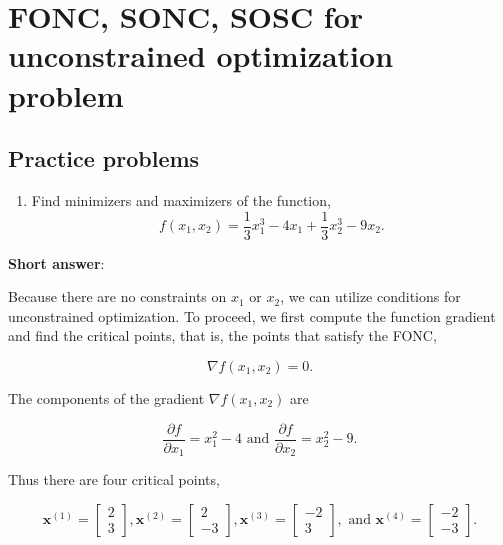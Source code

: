 \section{FONC, SONC, SOSC for unconstrained optimization problem}

\subsection{Practice problems}
\begin{enumerate}
	\item Find minimizers and maximizers of the function,	
	\[
		f\left(x_{1}, x_{2}\right)=\frac{1}{3} x_{1}^{3}-4 x_{1}+\frac{1}{3} x_{2}^{3}-9 x_{2} .
	\]

\end{enumerate}


\textbf{Short answer}:

Because there are no constraints on \(x_{1}\) or \(x_{2}\), we can utilize conditions for unconstrained optimization. To proceed, we first compute the function gradient and find the critical points, that is, the points that satisfy the FONC,

\[
	\nabla f\left(x_{1}, x_{2}\right)=0 .
\]

The components of the gradient \(\nabla f\left(x_{1}, x_{2}\right)\) are

\[
	\frac{\partial f}{\partial x_{1}}=x_{1}^{2}-4 \text { and } \frac{\partial f}{\partial x_{2}}=x_{2}^{2}-9 .
\]

Thus there are four critical points,

\[
	\boldsymbol{x}^{(1)}=\left[\begin{array}{l}
		2 \\
		3
	\end{array}\right], \boldsymbol{x}^{(2)}=\left[\begin{array}{c}
		2 \\
		-3
	\end{array}\right], \boldsymbol{x}^{(3)}=\left[\begin{array}{c}
		-2 \\
		3
	\end{array}\right], \text { and } \boldsymbol{x}^{(4)}=\left[\begin{array}{c}
		-2 \\
		-3
	\end{array}\right] .
\]

